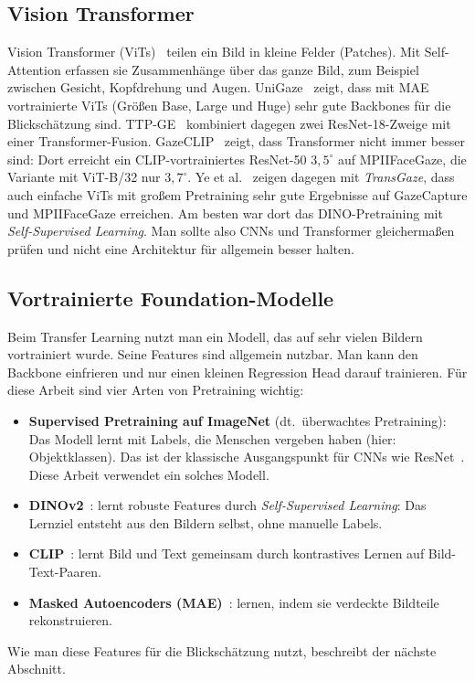 \subsection{Vision Transformer}
\label{subsec:vit}
Vision Transformer (ViTs)~\cite{dosovitskiy2021vit} teilen ein Bild in kleine
Felder (Patches). Mit Self-Attention erfassen sie Zusammenhänge über das ganze
Bild, zum Beispiel zwischen Gesicht, Kopfdrehung und Augen.
UniGaze~\cite{qin2026unigaze} zeigt, dass mit MAE vortrainierte ViTs (Größen
Base, Large und Huge) sehr gute Backbones für die Blickschätzung sind.
TTP-GE~\cite{nagpure2025ttpge} kombiniert dagegen zwei ResNet-18-Zweige mit
einer Transformer-Fusion. GazeCLIP~\cite{wang2026gazeclip} zeigt, dass
Transformer nicht immer besser sind: Dort erreicht ein CLIP-vortrainiertes
ResNet-50 $3,5^\circ$ auf MPIIFaceGaze, die Variante mit ViT-B/32 nur
$3,7^\circ$. Ye et al.~\cite{ye2024transgaze} zeigen dagegen mit
\emph{TransGaze}, dass auch einfache ViTs mit großem Pretraining sehr gute
Ergebnisse auf GazeCapture und MPIIFaceGaze erreichen. Am besten war dort das
DINO-Pretraining mit \emph{Self-Supervised Learning}. Man sollte also CNNs und Transformer
gleichermaßen prüfen und nicht eine Architektur für allgemein besser halten.

\subsection{Vortrainierte Foundation-Modelle}
\label{subsec:foundation}
Beim Transfer Learning nutzt man ein Modell, das auf sehr vielen Bildern
vortrainiert wurde. Seine Features sind allgemein nutzbar. Man kann den
Backbone einfrieren und nur einen kleinen Regression Head darauf trainieren.
Für diese Arbeit sind vier Arten von Pretraining wichtig:
\begin{itemize}
  \item \textbf{Supervised Pretraining auf ImageNet} (dt.\ überwachtes
        Pretraining): Das Modell lernt mit Labels, die Menschen vergeben
        haben (hier: Objektklassen). Das ist der klassische Ausgangspunkt für
        CNNs wie ResNet~\cite{he2016resnet}. Diese Arbeit verwendet ein
        solches Modell.
  \item \textbf{DINOv2}~\cite{oquab2023dinov2}: lernt robuste Features durch
        \emph{Self-Supervised Learning}: Das
        Lernziel entsteht aus den Bildern selbst, ohne manuelle Labels.
  \item \textbf{CLIP}~\cite{radford2021clip}: lernt Bild und Text gemeinsam
        durch kontrastives Lernen auf Bild-Text-Paaren.
  \item \textbf{Masked Autoencoders (MAE)}~\cite{he2022mae}: lernen, indem sie
        verdeckte Bildteile rekonstruieren.
\end{itemize}
Wie man diese Features für die Blickschätzung nutzt, beschreibt der nächste
Abschnitt.

